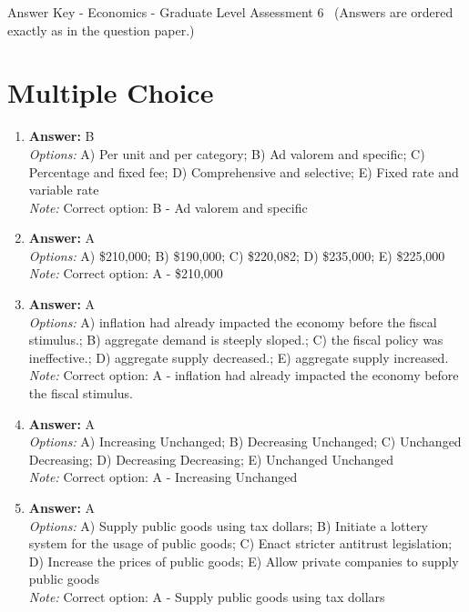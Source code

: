 \documentclass[12pt]{article}
\begin{document}
\begin{center}
Answer Key - Economics - Graduate Level Assessment 6 \
\small (Answers are ordered exactly as in the question paper.)
\end{center}

\section*{Multiple Choice}
\begin{enumerate}[label=\arabic*.]
\item \textbf{Answer:} B
\\ \textit{Options:} A) Per unit and per category; B) Ad valorem and specific; C) Percentage and fixed fee; D) Comprehensive and selective; E) Fixed rate and variable rate
\\ \textit{Note:} Correct option: B - Ad valorem and specific
\item \textbf{Answer:} A
\\ \textit{Options:} A) \$210,000; B) \$190,000; C) \$220,082; D) \$235,000; E) \$225,000
\\ \textit{Note:} Correct option: A - \$210,000
\item \textbf{Answer:} A
\\ \textit{Options:} A) inflation had already impacted the economy before the fiscal stimulus.; B) aggregate demand is steeply sloped.; C) the fiscal policy was ineffective.; D) aggregate supply decreased.; E) aggregate supply increased.
\\ \textit{Note:} Correct option: A - inflation had already impacted the economy before the fiscal stimulus.
\item \textbf{Answer:} A
\\ \textit{Options:} A) Increasing Unchanged; B) Decreasing Unchanged; C) Unchanged Decreasing; D) Decreasing Decreasing; E) Unchanged Unchanged
\\ \textit{Note:} Correct option: A - Increasing Unchanged
\item \textbf{Answer:} A
\\ \textit{Options:} A) Supply public goods using tax dollars; B) Initiate a lottery system for the usage of public goods; C) Enact stricter antitrust legislation; D) Increase the prices of public goods; E) Allow private companies to supply public goods
\\ \textit{Note:} Correct option: A - Supply public goods using tax dollars
\end{enumerate}
\end{document}
